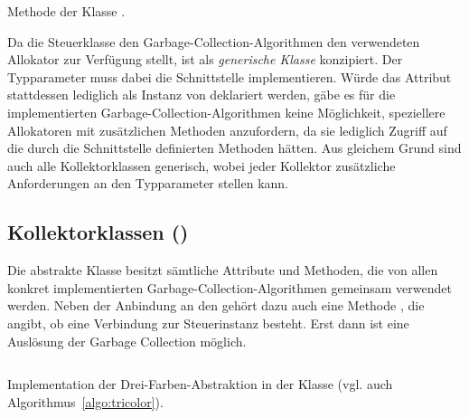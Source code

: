 \begin{listing}[h]
	\inputminted[]{java}{code/Controller-collect.java}
	\caption[Methode  der Klasse ]{Methode  der Klasse .}
	\label{java:controller-collect}
\end{listing}

Da die Steuerklasse den Garbage-Collection-Algorithmen den verwendeten Allokator zur Verfügung stellt, ist  als \textit{generische Klasse} konzipiert.
Der Typparameter  muss dabei die Schnittstelle  implementieren.
Würde das Attribut  stattdessen lediglich als Instanz von  deklariert werden, gäbe es für die implementierten Garbage-Collection-Algorithmen keine Möglichkeit, speziellere Allokatoren mit zusätzlichen Methoden anzufordern, da sie lediglich Zugriff auf die durch die Schnittstelle definierten Methoden hätten.
Aus gleichem Grund sind auch alle Kollektorklassen generisch, wobei jeder Kollektor zusätzliche Anforderungen an den Typparameter stellen kann.

\subsection{Kollektorklassen ()}
\label{sub:impl-gc}
Die abstrakte Klasse  besitzt sämtliche Attribute und Methoden, die von allen konkret implementierten Garbage-Collection-Algorithmen gemeinsam verwendet werden.
Neben der Anbindung an den  gehört dazu auch eine Methode , die angibt, ob eine Verbindung zur Steuerinstanz besteht.
Erst dann ist eine Auslösung der Garbage Collection möglich.

\begin{listing}[t!]
	\inputminted[]{java}{code/MarkSweep-core.java}
	\caption[Implementation der Drei-Farben-Abstraktion]{Implementation der Drei-Farben-Abstraktion in der Klasse  (vgl. auch Algorithmus~\ref{algo:tricolor}).}
	\label{java:tricolor-core}
\end{listing}


